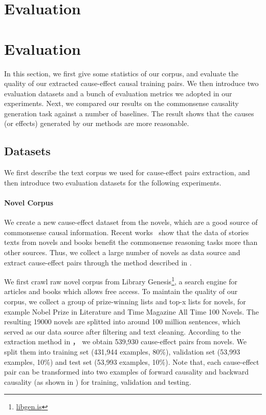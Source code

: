 \section{Evaluation}
\label{sec:eval}
\section{Evaluation}
\label{sec:eval}
In this section, we first give some statistics of our 
corpus, and evaluate the quality of our extracted 
cause-effect causal training pairs.
We then introduce two evaluation datasets and 
a bunch of evaluation metrics we adopted in our experiments. 
Next, we compared our results on the commonsense causality generation task against a number of baselines. 
The result shows that the causes (or effects) generated by our methods are more reasonable.

\subsection{Datasets}
\label{sec:datasets}
We first describe the text corpus we used for 
cause-effect pairs extraction, and then introduce
two evaluation datasets for the following experiments.

\paragraph{Novel Corpus}
\label{sec:novel_corpus}
We create a new cause-effect dataset from the novels,
which are a good source of commonsense causal information.
Recent works~\cite{gordon2011commonsense, trinh2018simple} show that 
the data of stories texts from novels and books benefit the commonsense reasoning tasks more than other sources.
Thus, we collect a large number of novels as data source and extract cause-effect pairs 
through the method described in .

\noindent We first crawl raw novel corpus from Library Genesis\footnote{\url{libgen.is}}, 
a search engine for articles and books which allows free access. 
To maintain the quality of our corpus, 
we collect a group of prize-winning lists and top-x lists for novels, 
for example Nobel Prize in Literature and Time Magazine All Time 100 Novels.
The resulting 19000 novels are splitted into around 100 million sentences, 
which served as our data source after filtering and text cleaning. 
According to the extraction method in ，
we obtain 539,930 cause-effect pairs from novels.
We split them into training set (431,944 examples, 80\%), validation set (53,993 examples, 10\%) and test set (53,993 examples, 10\%).
Note that, each cause-effect pair can be transformed into two examples of forward causality and backward causality
(as shown in )
for training, validation and testing.

